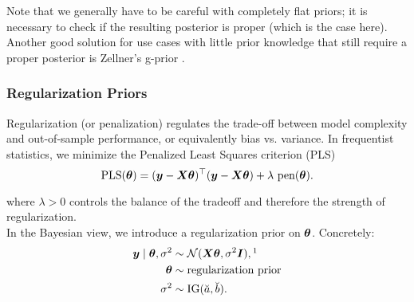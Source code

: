 Note that we generally have to be careful with completely flat priors; it is necessary to check if the resulting posterior is proper (which is the case here).\\

Another good solution for use cases with little prior knowledge that still require a proper posterior is Zellner's g-prior \citep{zellner_assessing_1986}.

\subsubsection*{Regularization Priors} \label{sec:lm-regularization}

Regularization (or penalization) regulates the trade-off between model complexity and out-of-sample performance, or equivalently bias vs. variance. 
In frequentist statistics, we minimize the Penalized Least Squares criterion (PLS) 
\begin{equation*}
    \text{PLS}(\btheta) = (\by - \bX \btheta)^\top (\by - \bX \btheta) + \lambda \ \text{pen}(\btheta).
\end{equation*}

where $\lambda > 0$ controls the balance of the tradeoff and therefore the strength of regularization.\\

In the Bayesian view, we introduce a regularization prior on $\bm{\theta}$.
Concretely:
\begin{equation*}
    \begin{aligned}
        \by \mid \btheta, \ssd &\sim \Ncal(\bX \btheta, \ssd \bI),\footnotemark \\
        \btheta &\sim \text{regularization prior}\\
        \ssd &\sim \IG(\apri, \bpri).
    \end{aligned}
\end{equation*}


